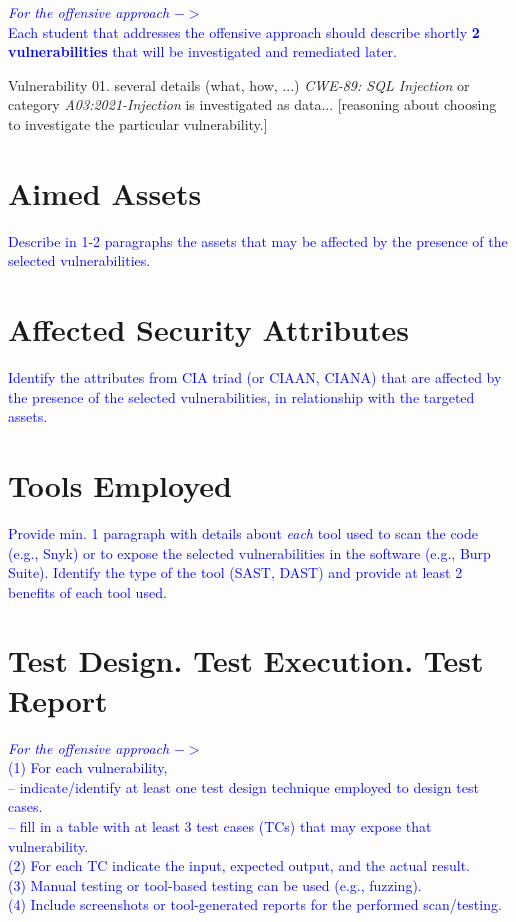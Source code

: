 \documentclass{article}
\begin{document}
\textcolor{blue}{\textit{For the offensive approach} $->$\\
Each student that addresses the offensive approach should describe shortly \textbf{2 vulnerabilities} that will be investigated and remediated later.
}

Vulnerability 01. several details (what, how, ...) \textit{CWE-89: SQL Injection} or category \textit{A03:2021-Injection}  \cite{Vuln001} is investigated as data... [reasoning about choosing to investigate the particular vulnerability.]



\section{Aimed Assets}
\label{}

\textcolor{blue}{Describe in 1-2 paragraphs the assets that may be affected by the presence of the selected vulnerabilities.
}

\section{Affected Security Attributes}
\label{}

\textcolor{blue}{Identify the attributes from CIA triad (or CIAAN, CIANA) that are affected by the presence of the selected vulnerabilities, in relationship with the targeted assets.
}


\section{Tools Employed}
\label{}

\textcolor{blue}{Provide min. 1 paragraph with details about \textit{each} tool used to scan the code (e.g., Snyk) or to expose the selected vulnerabilities in the software (e.g., Burp Suite). 
Identify the type of the tool (SAST, DAST) and provide at least 2 benefits of each tool used.
}


\section{Test Design. Test Execution. Test Report}
\label{}

\textcolor{blue}{\textit{For the offensive approach} $->$\\
(1) For each vulnerability, \\
-- indicate/identify at least one test design technique employed to design test cases.\\
-- fill in a table with at least 3 test cases (TCs) that may expose that vulnerability.\\
(2) For each TC indicate the input, expected output, and the actual result.\\
(3) Manual testing or tool-based testing can be used (e.g., fuzzing).\\
(4) Include screenshots or tool-generated reports for the performed scan/testing.}
\end{document}
